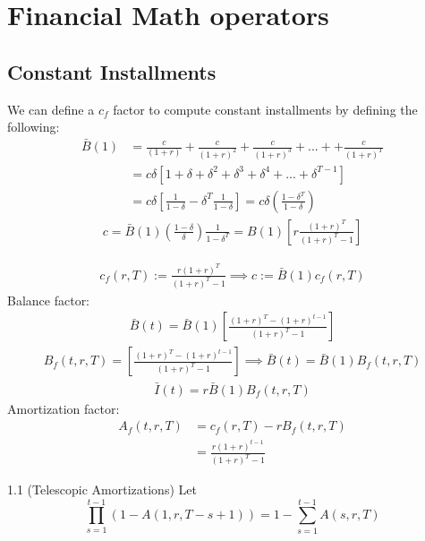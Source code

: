 \section{Financial Math operators}
\subsection{Constant Installments}
We can define a $c_f$ factor to compute constant installments by defining the following:
\begin{align}
    \bar{B}(1) &= \frac{c}{(1+r)}+\frac{c}{(1+r)^2}+\frac{c}{(1+r)^3}+...++\frac{c}{(1+r)^T} \nonumber\\
    &=c\delta[1+\delta+\delta^2+\delta^3+\delta^4+...+\delta^{T-1}] \nonumber \\
    &=c\delta\left[\frac{1}{1-\delta}-\delta^T\frac{1}{1-\delta}\right] =c\delta\left(\frac{1-\delta^T}{1-\delta}\right)
\end{align}
\begin{align}
    c=\bar{B}(1)\left(\frac{1-\delta}{\delta}\right)\frac{1}{1-\delta^T}=B(1)\left[r\frac{(1+r)^T}{(1+r)^T-1}\right]
\end{align}

\begin{align}
    c_f(r,T):=\frac{r(1+r)^T}{(1+r)^T-1} \implies c:=\bar{B}(1)c_f(r,T)
\end{align}
Balance factor:
\begin{align}
    \bar{B}(t)=\bar{B}(1)\left[ \frac{(1+r)^T-(1+r)^{t-1}}{(1+r)^T-1} \right]
\end{align}
\begin{align}
    B_f(t,r,T)=\left[ \frac{(1+r)^T-(1+r)^{t-1}}{(1+r)^T-1} \right] \implies \bar{B}(t)=\bar{B}(1)B_f(t,r,T)
\end{align}
\begin{align}
    \bar{I}(t) = r\bar{B}(1)B_f(t,r,T)
\end{align}
Amortization factor:
\begin{align}
    A_f(t,r,T) &= c_f(r,T)-rB_f(t,r,T)\\
    &=\frac{r(1+r)^{t-1}}{(1+r)^T-1}
\end{align}


\begin{theorem}{1.1 (Telescopic Amortizations)}{} \label{teo:1}
Let
\[
\prod^{t-1}_{s=1}(1-A(1,r,T-s+1))=1-\sum^{t-1}_{s=1}A(s,r,T)
\]
\end{theorem}

